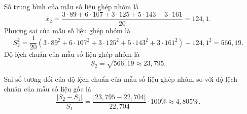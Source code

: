 \begin{vd}
{\begin{enumEX}{1}
\begin{center}
\begin{tabular}{|c|c|c|c|c|c|}
				\end{tabular}
			\end{center}
			Số trung bình của mẫu số liệu ghép nhóm là
			$$\bar{x}_2=\dfrac{3\cdot 89+6\cdot 107+3\cdot 125+5\cdot 143+3\cdot 161}{20}=124,1.$$
			Phương sai của mẫu số liệu ghép nhóm là
			$$S_2^2=\dfrac{1}{20}\left(3\cdot 89^2+6\cdot 107^2+3\cdot 125^2+5\cdot 143^2+3\cdot 161^2\right)-124,1^2=566,19.$$
			Độ lệch chuẩn của mẫu số liệu ghép nhóm là
			$$S_2=\sqrt{566,19} \approx 23,795.$$
			\item Sai số tương đối của độ lệch chuẩn của mẫu số liệu ghép nhóm so với độ lệch chuẩn của mẫu số liệu gốc là
			$$\dfrac{\left|S_2-S_1\right|}{S_1}=\dfrac{|23,795-22,704|}{22,704} \cdot 100 \% \approx 4,805 \%.$$
		\end{enumEX}
	}
\end{vd}

